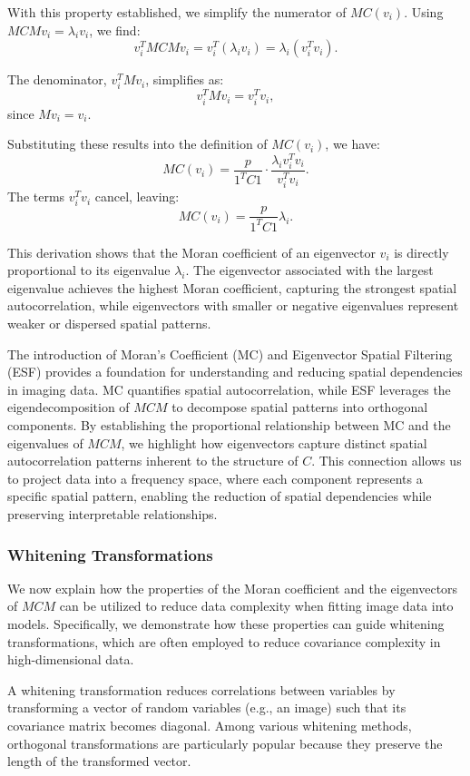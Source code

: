 \documentclass[12pt]{article}
\begin{document}
With this property established, we simplify the numerator of \( MC(v_i) \). Using \( MCM v_i = \lambda_i v_i \), we find:
\[
  v_i^T MCM v_i = v_i^T (\lambda_i v_i) = \lambda_i (v_i^T v_i).
\]

The denominator, \( v_i^T M v_i \), simplifies as:
\[
  v_i^T M v_i = v_i^T v_i,
\]
since \( M v_i = v_i \).

Substituting these results into the definition of \( MC(v_i) \), we have:
\[
  MC(v_i) = \frac{p}{1^T C 1} \cdot \frac{\lambda_i v_i^T v_i}{v_i^T v_i}.
\]
The terms \( v_i^T v_i \) cancel, leaving:
\[
  MC(v_i) = \frac{p}{1^T C 1} \lambda_i.
\]

This derivation shows that the Moran coefficient of an eigenvector \( v_i \) is directly proportional to its eigenvalue \( \lambda_i \). The eigenvector associated with the largest eigenvalue achieves the highest Moran coefficient, capturing the strongest spatial autocorrelation, while eigenvectors with smaller or negative eigenvalues represent weaker or dispersed spatial patterns.

The introduction of Moran’s Coefficient (MC) and Eigenvector Spatial Filtering (ESF) provides a foundation for understanding and reducing spatial dependencies in imaging data. MC quantifies spatial autocorrelation, while ESF leverages the eigendecomposition of \( MCM \) to decompose spatial patterns into orthogonal components. By establishing the proportional relationship between MC and the eigenvalues of \( MCM \), we highlight how eigenvectors capture distinct spatial autocorrelation patterns inherent to the structure of \( C \). This connection allows us to project data into a frequency space, where each component represents a specific spatial pattern, enabling the reduction of spatial dependencies while preserving interpretable relationships.



\subsubsection{Whitening Transformations}

We now explain how the properties of the Moran coefficient and the eigenvectors of \( MCM \) can be utilized to reduce data complexity when fitting image data into models. Specifically, we demonstrate how these properties can guide whitening transformations, which are often employed to reduce covariance complexity in high-dimensional data.

A whitening transformation reduces correlations between variables by transforming a vector of random variables (e.g., an image) such that its covariance matrix becomes diagonal. Among various whitening methods, orthogonal transformations are particularly popular because they preserve the length of the transformed vector.
\end{document}
